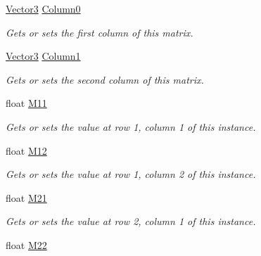 \begin{DoxyCompactItemize}
\item 
\hyperlink{struct_open_t_k_1_1_vector3}{Vector3} \hyperlink{struct_open_t_k_1_1_matrix3x2_a2a284f0363ee1882bdc3aea30a3074a2}{Column0}
\begin{DoxyCompactList}\small\item\em Gets or sets the first column of this matrix. \end{DoxyCompactList}\item 
\hyperlink{struct_open_t_k_1_1_vector3}{Vector3} \hyperlink{struct_open_t_k_1_1_matrix3x2_a4a05efc768de57bd82ad6fe12aeb5074}{Column1}
\begin{DoxyCompactList}\small\item\em Gets or sets the second column of this matrix. \end{DoxyCompactList}\item 
float \hyperlink{struct_open_t_k_1_1_matrix3x2_a7a97cdaa0dcd0073a4c69434da00a3d2}{M11}
\begin{DoxyCompactList}\small\item\em Gets or sets the value at row 1, column 1 of this instance. \end{DoxyCompactList}\item 
float \hyperlink{struct_open_t_k_1_1_matrix3x2_a574ef825368bcb50b8fc8293cdd228be}{M12}
\begin{DoxyCompactList}\small\item\em Gets or sets the value at row 1, column 2 of this instance. \end{DoxyCompactList}\item 
float \hyperlink{struct_open_t_k_1_1_matrix3x2_af3969ee982b72a91dda03f5b26842fda}{M21}
\begin{DoxyCompactList}\small\item\em Gets or sets the value at row 2, column 1 of this instance. \end{DoxyCompactList}\item 
float \hyperlink{struct_open_t_k_1_1_matrix3x2_a373be87c7c248ed56a1a56fd5f0a8d94}{M22}

\end{DoxyCompactItemize}
